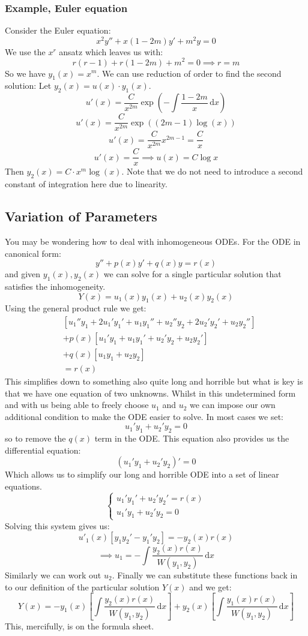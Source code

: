 \documentclass[12pt]{article}
\begin{document}
\subsubsection*{Example, Euler equation}
Consider the Euler equation:
\[x^2y''+x(1-2m)y'+m^2y=0\]
We use the \(x^r\) ansatz which leaves us with:
\[r(r-1)+r(1-2m)+m^2=0\implies r=m\]
So we have \(y_1(x)=x^m\). We can use reduction of order to find the second solution: Let \(y_2(x)=u(x)\cdot y_1(x)\).
\[u'(x)=\frac{C}{x^{2m}}\exp{\left(-\int \frac{1-2m}{x}\,\text{d} x\right)}\]
\[u'(x)=\frac{C}{x^{2m}}\exp((2m-1)\log(x))\]
\[u'(x)=\frac{C}{x^{2m}}x^{2m-1}=\frac{C}{x}\]
\[u'(x)=\frac{C}{x}\implies u(x)=C\log x\]
Then \(y_2(x)=C\cdot x^m\log(x)\). Note that we do not need to introduce a second constant of integration here due to linearity.
\subsection{Variation of Parameters}
You may be wondering how to deal with inhomogeneous ODEs. For the ODE in canonical form:
\[y''+p(x)y'+q(x)y=r(x)\]
and given \(y_1(x), y_2(x)\) we can solve for a single particular solution that satisfies the inhomogeneity.
\[Y(x)=u_1(x)y_1(x)+u_2(x)y_2(x)\]
Using the general product rule we get:
\begin{align*}
    &[u_1''y_1+2u_1'y_1'+u_1y_1''+u_2''y_2+2u_2'y_2'+u_2y_2'']\\
    &+p(x)[u_1'y_1+u_1y_1'+u_2'y_2+u_2y_2']\\
    &+ q(x)[u_1y_1+u_2y_2]\\
    &=r(x)
\end{align*}
This simplifies down to something also quite long and horrible but what is key is that we have one equation of two unknowns. Whilst in this undetermined form and with us being able to freely choose \(u_1\) and \(u_2\) we can impose our own additional condition to make the ODE easier to solve. In most cases we set:
\[u_1'y_1+u_2'y_2=0\]
so to remove the \(q(x)\) term in the ODE. This equation also provides us the differential equation:
\[(u_1'y_1+u_2'y_2)'=0\]
Which allows us to simplify our long and horrible ODE into a set of linear equations.
\[\begin{cases}
    u_1'y_1'+u_2'y_2'=r(x) \\
    u_1'y_1+u_2'y_2=0
\end{cases}\]
Solving this system gives us:
\[u'_1(x)[y_1y_2'-y_1'y_2]=-y_2(x)r(x)\]
\[\implies u_1=-\int\frac{y_2(x)r(x)}{W(y_1,y_2)}\,\text{d}x\]
Similarly we can work out \(u_2\). Finally we can substitute these functions back in to our definition of the particular solution \(Y(x)\) and we get:
\[Y(x)=-y_1(x)\left[\int\frac{y_2(x)r(x)}{W(y_1,y_2)}\,\text{d}x\right]+y_2(x)\left[\int\frac{y_1(x)r(x)}{W(y_1,y_2)}\,\text{d}x\right]\]
This, mercifully, is on the formula sheet.
\clearpage
\end{document}
